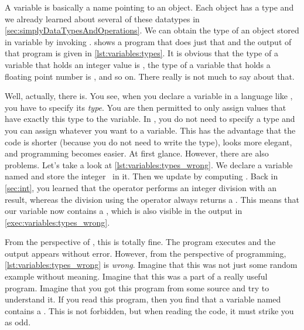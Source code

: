 %
\label{sec:variableTypesAndTypeHints}%
%
%
%
%
A variable is basically a name pointing to an object.
Each object has a type and we already learned about several of these datatypes in \cref{sec:simplyDataTypesAndOperations}.
We can obtain the type of an object stored in variable  by invoking .
 shows a program that does just that and the output of that program is given in \cref{lst:variables:types}.
It is obvious that the type of a variable that holds an integer value is , the type of a variable that holds a floating point number is , and so on.
There really is not much to say about that.%
\endhsection%
%
%

Well, actually, there is.
You see, when you declare a variable in a language like , you have to specify its \emph{type}.
You are then permitted to only assign values that have exactly this type to the variable.
In \python, you do not need to specify a type and you can assign whatever you want to a variable.
This has the advantage that the code is shorter (because you do not need to write the type), looks more elegant, and programming becomes easier.
At first glance.
However, there are also problems.
Let's take a look at \cref{lst:variables:types_wrong}.
We declare a variable named  and store the integer~ in it.
Then we update  by computing .
Back in \cref{sec:int}, you learned that the \pythonilIdx{//} operator performs an integer division with an  result, whereas the division using the \pythonilIdx{/} operator always returns a .
This means that our variable  now contains a , which is also visible in the output in \cref{exec:variables:types_wrong}.

From the perspective of \python, this is totally fine.
The program executes and the output appears without error.
However, from the perspective of programming, \cref{lst:variables:types_wrong} is \emph{wrong}.
Imagine that this was not just some random example without meaning.
Imagine that this was a part of a really useful program.
Imagine that you got this program from some source and try to understand it.
If you read this program, then you find that a variable named  contains a .
This is not forbidden, but when reading the code, it must strike you as odd.

